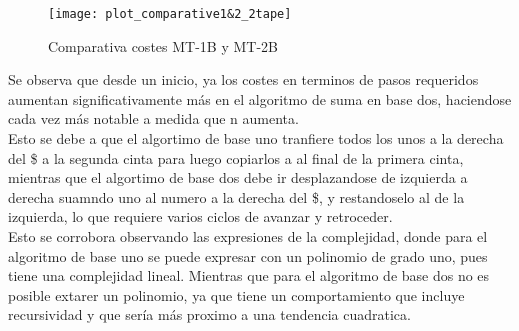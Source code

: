 \begin{figure}[h]
    \centering
    \texttt{[image: plot\_comparative1\&2\_2tape]}
    \caption{Comparativa costes MT-1B y MT-2B}
\end{figure}

Se observa que desde un inicio, ya los costes en terminos de pasos requeridos aumentan significativamente más en el algoritmo de suma en base dos, haciendose cada vez más notable a medida que n aumenta.\\ Esto se debe a que el algortimo de base uno tranfiere todos los unos a la derecha del \$ a la segunda cinta para luego copiarlos a al final de la primera cinta, mientras que el algortimo de base dos debe ir desplazandose de izquierda a derecha suamndo uno al numero a la derecha del \$, y restandoselo al de la izquierda, lo que requiere varios ciclos de avanzar y retroceder.\\
Esto se corrobora observando las expresiones de la complejidad, donde para el algoritmo de base uno se puede expresar con un polinomio de grado uno, pues tiene una complejidad lineal. Mientras que para el algoritmo de base dos no es posible extarer un polinomio, ya que tiene un comportamiento que incluye recursividad y que sería más proximo a una tendencia cuadratica.
